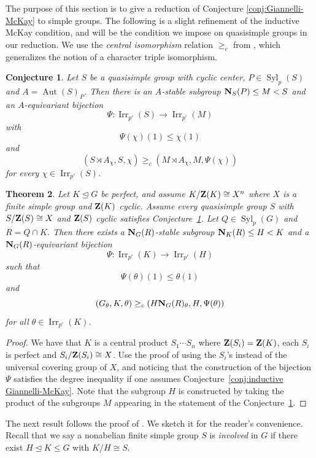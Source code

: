 \documentclass[12pt]{amsart}
\theoremstyle{plain}
\newtheorem{thm}{Theorem}[section]
\newtheorem{conj}[thm]{Conjecture}
\theoremstyle{definition}
\numberwithin{equation}{section}
\newcommand{\normal}{\trianglelefteq}
\newcommand{\Syl}{\operatorname{Syl}}
\newcommand{\Aut}{\operatorname{Aut}}
\newcommand{\Irr}{\operatorname{Irr}}
\def\zent#1{{\bf Z}(#1)}
\def\norm#1#2{{\bf N}_{#1}(#2)}
\begin{document}
The purpose of this section is to give a reduction of Conjecture
\ref{conj:Giannelli-McKay} to simple groups. The following is a
slight refinement of the inductive McKay condition, and will be the
condition we impose on quasisimple groups in our reduction. We use
the \emph{central isomorphism} relation $\geq_c$ from
\cite[Definition 10.14]{N}, which generalizes the notion of a
character triple isomorphism.

\begin{conj}\label{conj:inductive Giannelli-McKay}
Let $S$ be a quasisimple group with cyclic center, $P\in\Syl_p(S)$
and $A=\Aut(S)_P$. Then there is an $A$-stable subgroup $\norm S
P\leq M < S$ and an $A$-equivariant bijection
$$\Psi:\Irr_{p'}(S)\rightarrow\Irr_{p'}(M)$$ with
\[\Psi(\chi)(1)\leq\chi(1)\] and $$(S\rtimes
A_\chi,S,\chi)\geq_c(M\rtimes A_\chi, M, \Psi(\chi))$$ for every
$\chi\in\Irr_{p'}(S)$.
\end{conj}

\begin{thm}\label{thm:perfect}
Let $K\normal G$ be perfect, and assume $K/\zent K\cong X^n$ where
$X$ is a finite simple group and $\zent K$ cyclic. Assume every
quasisimple group $S$ with $S/\zent S\cong X$ and $\zent S$ cyclic
satisfies Conjecture~\ref{conj:inductive Giannelli-McKay}. Let
$Q\in\Syl_p(G)$ and $R=Q\cap K$. Then there exists a $\norm G
R$-stable subgroup $\norm K R\leq H < K$ and a $\norm G
R$-equivariant bijection
$$\Psi:\Irr_{p'}(K)\rightarrow\Irr_{p'}(H)$$ such that \[\Psi(\theta)(1)\leq\theta(1)\] and
$$(G_\theta,K,\theta)\geq_c(H\norm G R_\theta, H,\Psi(\theta))$$
for all $\theta\in\Irr_{p'}(K)$.
\end{thm}

\begin{proof}
We have that $K$ is a central product $S_1\cdots S_n$ where
$\zent{S_i}=\zent K$, each $S_i$ is perfect and $S_i/\zent{S_i}\cong
X$. Use the proof of \cite[Theorem~10.25]{N} using the $S_i$'s
instead of the universal covering group of $X$, and noticing that
the construction of the bijection $\Psi$ satisfies the degree
inequality if one assumes Conjecture~\ref{conj:inductive
Giannelli-McKay}. Note that the subgroup $H$ is constructed by
taking the product of the subgroups $M$ appearing in the statement
of the Conjecture~\ref{conj:inductive Giannelli-McKay}.
\end{proof}


The next result follows the proof of \cite[Theorem 10.26]{N}. We
sketch it for the reader's convenience. Recall that we say a nonabelian finite
simple group $S$ is \emph{involved} in $G$ if there exist $H\normal K\leq G$ with $K/H\cong S$.
\end{document}
